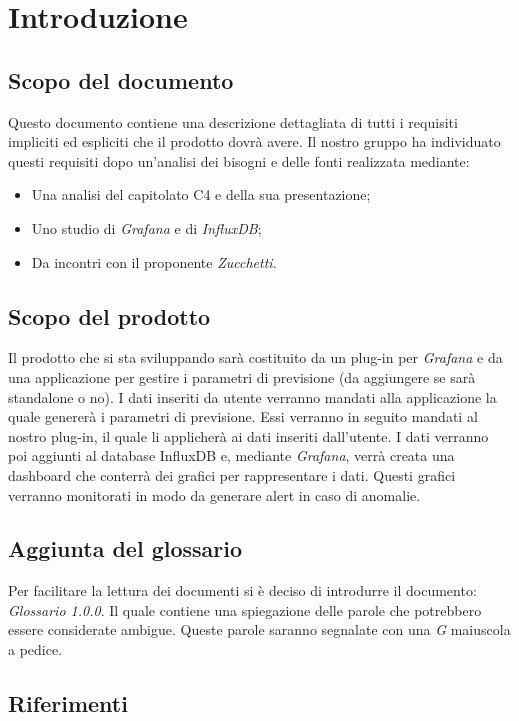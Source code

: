 \documentclass[a4]{article}
\begin{document}
	\section{Introduzione}
		\subsection{Scopo del documento}
			Questo documento contiene una descrizione dettagliata di tutti i requisiti impliciti ed espliciti che il prodotto dovrà avere. Il nostro gruppo ha individuato questi requisiti dopo un'analisi dei bisogni e delle fonti realizzata mediante: 
				\begin{itemize}
					\item Una analisi del capitolato C4 e della sua presentazione; 
					\item Uno studio di \textit{Grafana} e di \textit{InfluxDB};
					\item Da incontri con il proponente \textit{Zucchetti}.
				\end{itemize}
		\subsection{Scopo del prodotto}
			Il prodotto che si sta sviluppando sarà costituito da un plug-in per \textit{Grafana} e da una applicazione per gestire i parametri di previsione (da aggiungere se sarà standalone o no). I dati inseriti da utente verranno mandati alla applicazione la quale genererà i parametri di previsione. Essi verranno in seguito mandati al nostro plug-in, il quale li applicherà ai dati inseriti dall'utente. I dati verranno poi aggiunti al database InfluxDB e, mediante \textit{Grafana}, verrà creata una dashboard che conterrà dei grafici per rappresentare i dati. Questi grafici verranno monitorati in modo da generare alert in caso di anomalie.
		
		\subsection{Aggiunta del glossario}
			Per facilitare la lettura dei documenti si è deciso di introdurre il documento: \textit{Glossario 1.0.0}. Il quale contiene una spiegazione delle parole che potrebbero essere considerate ambigue. Queste parole saranno segnalate con una \textit{G} maiuscola a pedice. 
		\subsection{Riferimenti}
\end{document}

